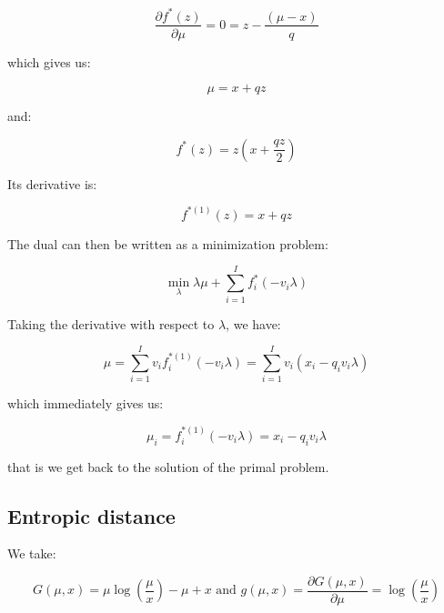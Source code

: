 \documentclass{tex/note}
\begin{document}
\begin{equation*}
\frac{\partial f^* \left( z \right)}{\partial \mu} = 0 = z - \frac{ \left( \mu - x \right)}{q}
\end{equation*}

which gives us:

\begin{equation*}
\mu = x + q z
\end{equation*}

and:

\begin{equation*}
f^* \left( z \right) = z \left( x + \frac{q z}{2} \right)
\end{equation*}

Its derivative is:

\begin{equation*}
f^{* \left( 1 \right)} \left( z \right) = x + q z
\end{equation*}

The dual can then be written as a minimization problem:

\begin{equation*}
\min_\lambda \lambda \mu + \sum_{i = 1}^I f_i^* \left( - v_i \lambda \right)
\end{equation*}

Taking the derivative with respect to $\lambda$, we have:

\begin{equation*}
\mu = \sum_{i = 1}^I v_i f_i^{* \left( 1 \right)} \left( - v_i \lambda \right) = \sum_{i = 1}^I v_i \left( x_i - q_i v_i \lambda \right)
\end{equation*}

which immediately gives us:

\begin{equation*}
\mu_i = f_i^{* \left( 1 \right)} \left( - v_i \lambda \right) = x_i - q_i v_i \lambda
\end{equation*}

that is we get back to the solution of the primal problem.

\subsection{Entropic distance}

We take:

\begin{equation*}
G \left( \mu , x \right) = \mu \log \left( \frac{\mu}{x} \right) - \mu + x \text{ and } g \left( \mu , x \right) = \frac{\partial G \left( \mu , x \right)}{\partial \mu} = \log \left( \frac{\mu}{x} \right)
\end{equation*}
\end{document}
